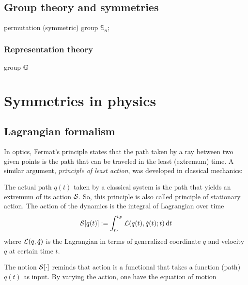 \subsection{Group theory and symmetries}
permutation (symmetric) group $\mathbb{S}_n$;

\subsubsection{Representation theory}\label{sec:representation_theory}
group $\mathbb{G}$

\section{Symmetries in physics}
\subsection{Lagrangian formalism}\label{sec:lagrangian}
In optics, Fermat's principle states that the path taken by a ray between two given points is the path that can be traveled in the least (extremum) time. 
A similar argument, \emph{principle of least action}, was developed in classical mechanics:
\begin{axiom}\label{thm:least_action}
    The actual path $q(t)$ taken by a classical system is the path that 
	yields an extremum of its action \(\mathcal{S}\).
	So, this principle is also called principle of stationary action.
	The action of the dynamics is the integral of Lagrangian over time
	\begin{equation}
		\mathcal{S}[q(t)]:=\int_{t_I}^{t_F}\mathcal{L}(q(t),\dot{q}(t);t)\dd{t}
		\label{eq:action}
	\end{equation}
	where $\mathcal{L}(q,\dot{q})$ is the Lagrangian in terms of generalized coordinate $q$ and velocity $\dot{q}$ at certain time $t$. 
\end{axiom}
The notion $\mathcal{S}[\cdot]$ reminds that action is a functional that takes a function (path) $q(t)$ as input.
By varying the action, one have the equation of motion 
